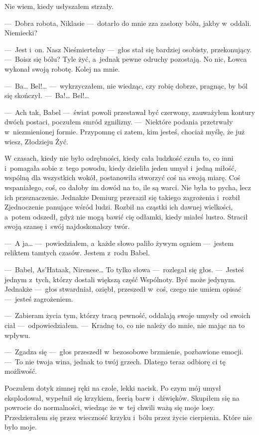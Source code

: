 Nie wiem, kiedy usłyszałem strzały.

---~Dobra robota, Niklasie ---~dotarło do mnie zza zasłony bólu, jakby w~oddali. Niemiecki? 

---~Jest i~on. Nasz Nieśmiertelny ---~głos stał się bardziej osobisty, przekonujący. ---~Boisz się bólu? Tyle żyć, a~jednak pewne odruchy pozostają. No nic, Łowca wykonał swoją robotę. Kolej na mnie.

---~Ba… Bel!… ---~wykrzyczałem, nie wiedząc, czy robię dobrze, pragnąc, by ból się skończył. ---~Ba!… Bel!…

---~Ach tak, Babel ---~świat powoli przestawał być czerwony, zauważyłem kontury dwóch postaci, poczułem smród zgnilizny. ---~Niektóre podania przetrwały w~niezmienionej formie. Przypomnę ci zatem, kim jesteś, chociaż myślę, że już wiesz, Złodzieju Żyć.

W czasach, kiedy nie było odrębności, kiedy cała ludzkość czuła to, co inni i~pomagała sobie z~tego powodu, kiedy dzieliła jeden umysł i~jedną miłość, wspólną dla wszystkich wokół, postanowiła stworzyć coś na swoją miarę. Coś wspaniałego, coś, co dałoby im dowód na to, ile są warci. Nie była to pycha, lecz ich przeznaczenie. Jednakże Demiurg przeraził się takiego zagrożenia i~rozbił Zjednoczenie panujące wśród ludzi. Rozbił na cząstki ich dawnej wielkości, a~potem odszedł, gdyż nie mogą bawić cię odłamki, kiedy miałeś lustro. Stracił swoją szansę i~swój najdoskonalszy twór.

---~A ja… ---~powiedziałem, a~każde słowo paliło żywym ogniem ---~jestem reliktem tamtych czasów. Jestem z~rodu Babel.

---~Babel, As’Hataak, Nirenese… To tylko słowa ---~rozlegał się głos. ---~Jesteś jednym z~tych, którzy dostali większą część Wspólnoty. Być może jedynym. Jednakże ---~głos stwardniał, oziębł, przeszedł w~coś, czego nie umiem opisać ---~jesteś zagrożeniem.

---~Zabieram życia tym, którzy tracą pewność, oddalają swoje umysły od swoich ciał ---~odpowiedziałem. ---~Kradnę to, co nie należy do mnie, nie mając na to wpływu.

---~Zgadza się ---~głos przeszedł w~bezosobowe brzmienie, pozbawione emocji. ---~To nie twoja wina, jednak to twój grzech. Dlatego teraz odbiorę ci tę możliwość.

Poczułem dotyk zimnej ręki na czole, lekki nacisk. Po czym mój umysł eksplodował, wypełnił się krzykiem, feerią barw i~dźwięków. Skupiłem się na powrocie do normalności, wiedząc że w~tej chwili ważą się moje losy. Przedzierałem się przez wieczność krzyku i~bólu przez życie cierpienia. Które nie było moje.

